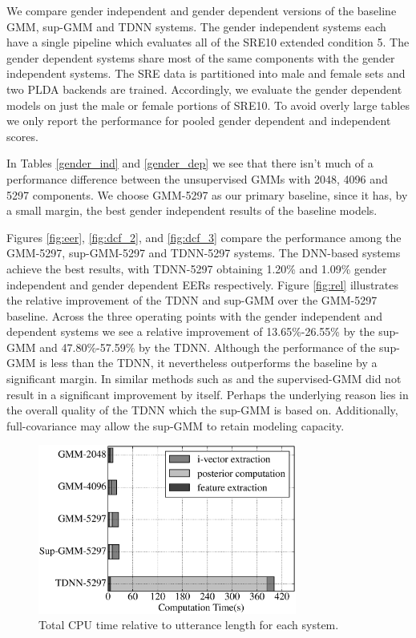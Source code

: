 \documentclass{article}
\begin{document}
We compare gender independent and gender dependent versions of the
baseline GMM, sup-GMM and TDNN systems. The gender independent
systems each have a single pipeline which evaluates all of the SRE10
extended condition 5. The gender dependent systems share most of the
same components with the gender independent systems. 
The SRE data is partitioned into male and female sets and two PLDA
backends are trained. Accordingly, we evaluate the gender
dependent models on just the male or female portions of SRE10. To avoid 
overly large
tables we only report the performance for pooled gender dependent
and independent scores.

In Tables \ref{gender_ind} and \ref{gender_dep} we see that there
isn't much of a performance difference between
the unsupervised GMMs with 2048, 4096 and 5297 components. 
We choose GMM-5297 as our primary baseline, since it has, by a small margin,
the best gender independent results of the baseline models.

Figures \ref{fig:eer}, \ref{fig:dcf_2}, and \ref{fig:dcf_3}
compare the performance among the GMM-5297,
sup-GMM-5297 and TDNN-5297 systems. The DNN-based systems achieve the
best results, with TDNN-5297 obtaining 1.20\% and 1.09\%
gender independent and gender dependent EERs respectively.
Figure \ref{fig:rel} illustrates the relative improvement of the
TDNN and sup-GMM over the GMM-5297 baseline. Across the three
operating points with the gender independent and dependent systems we 
see a relative improvement of 13.65\%-26.55\%
by the sup-GMM and 47.80\%-57.59\% by the TDNN. Although
the performance of the sup-GMM is less than the TDNN,
it nevertheless outperforms the baseline by a significant
margin. In similar methods such as \cite{lei2014} and \cite{omar2010}
the supervised-GMM did not result in a significant improvement by
itself. Perhaps the underlying reason lies in the overall quality of
the TDNN which the sup-GMM is based on. Additionally, 
full-covariance may allow the sup-GMM to retain modeling capacity.

\begin{figure}[t]
\centerline{\includegraphics[width=8.5cm]{fig/time}}
\caption{Total CPU time relative to utterance length for each system.}
\label{fig:time}
\end{figure}
\end{document}
